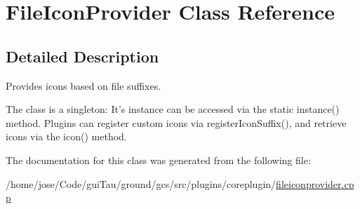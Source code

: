\hypertarget{class_file_icon_provider}{\section{File\-Icon\-Provider Class Reference}
\label{class_file_icon_provider}
}


\subsection{Detailed Description}
Provides icons based on file suffixes.

The class is a singleton\-: It's instance can be accessed via the static instance() method. Plugins can register custom icons via register\-Icon\-Suffix(), and retrieve icons via the icon() method. 

The documentation for this class was generated from the following file\-:\begin{DoxyCompactItemize}
\item 
/home/jose/\-Code/gui\-Tau/ground/gcs/src/plugins/coreplugin/\hyperlink{fileiconprovider_8cpp}{fileiconprovider.\-cpp}\end{DoxyCompactItemize}
